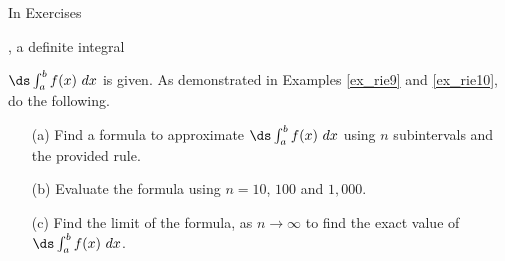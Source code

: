 {\noindent In Exercises}
{, a definite integral 

$\ds \int_a^b f(x) \ dx$ is given. As demonstrated in Examples \ref{ex_rie9} and \ref{ex_rie10}, do the following.
\begin{enumerate}
\item[(a)]		Find a formula to approximate $\ds \int_a^bf(x)\ dx$ using $n$ subintervals and the provided rule.
\item[(b)]		Evaluate the formula using $n=10$, $100$ and $1,000$. 
\item[(c)]		Find the limit of the formula, as $n\to \infty$ to find the exact value of $\ds \int_a^bf(x)\ dx$.
\end{enumerate}
}
